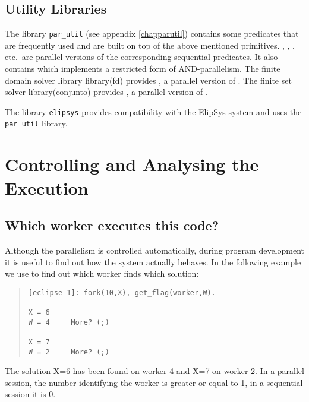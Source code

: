 \subsection{Utility Libraries}
The library {\tt par_util} (see appendix \ref{chapparutil})
contains some predicates that are frequently
used and are built on top of the above mentioned primitives.
, , ,
 etc.\ are parallel versions of the corresponding
sequential predicates.
It also contains  which implements a restricted form of
AND-parallelism.
The finite domain solver library library(fd) provides ,
a parallel version of .
The finite set solver library(conjunto) provides ,
a parallel version of .

The library {\tt elipsys} provides compatibility with the ElipSys system and
uses the {\tt par_util} library.

\section{Controlling and Analysing the Execution}
\subsection{Which worker executes this code?}
Although the parallelism is controlled automatically,
during program development it is useful to find out how the system
actually behaves. In the following example we use 
to find out which worker finds which solution:
\begin{quote}\begin{verbatim}
[eclipse 1]: fork(10,X), get_flag(worker,W).

X = 6
W = 4     More? (;) 

X = 7
W = 2     More? (;) 
\end{verbatim}\end{quote}
The solution X=6 has been found on worker 4 and X=7 on worker 2.
In a parallel session, the number identifying the worker is greater
or equal to 1, in a sequential session it is 0.

